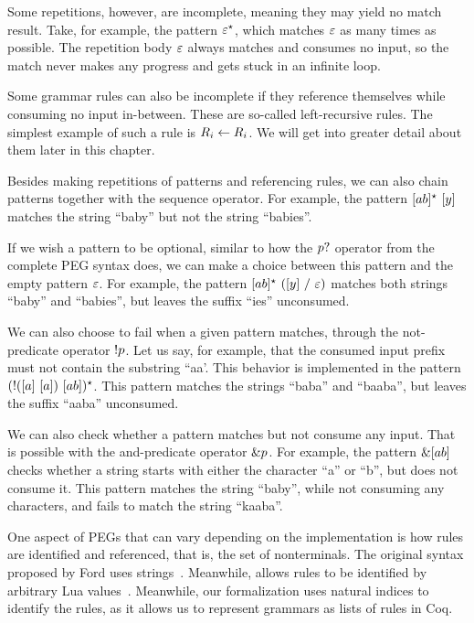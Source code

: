 Some repetitions, however, are incomplete,
meaning they may yield no match result.
Take, for example, the pattern $\varepsilon^\star$,
which matches $\varepsilon$ as many times as possible.
The repetition body $\varepsilon$ always matches and consumes no input,
so the match never makes any progress and gets stuck in an infinite loop.

Some grammar rules can also be incomplete
if they reference themselves
while consuming no input in-between.
These are so-called left-recursive rules.
The simplest example of such a rule is $R_{i} \leftarrow R_{i}$.
We will get into greater detail about them later in this chapter.

Besides making repetitions of patterns
and referencing rules,
we can also chain patterns together
with the sequence operator.
For example,
the pattern $[ab]^\star\ [y]$
matches the string ``baby'' but not the string ``babies''.

If we wish a pattern to be optional,
similar to how the $p?$ operator from the
complete PEG syntax does,
we can make a choice between this pattern
and the empty pattern $\varepsilon$.
For example,
the pattern $[ab]^\star\ ([y]\ /\ \varepsilon)$
matches both strings ``baby'' and ``babies'',
but leaves the suffix ``ies'' unconsumed.

We can also choose to fail when a given pattern matches,
through the not-predicate operator $!p$.
Let us say, for example,
that the consumed input prefix
must not contain the substring ``aa'.
This behavior is implemented in the pattern
$(!([a]\ [a])\ [ab])^\star$.
This pattern matches the strings ``baba'' and ``baaba'',
but leaves the suffix ``aaba'' unconsumed.

We can also check whether a pattern matches
but not consume any input.
That is possible with the and-predicate operator $\&p$.
For example,
the pattern $\&[ab]$
checks whether a string
starts with either the character ``a'' or ``b'',
but does not consume it.
This pattern matches the string ``baby'',
while not consuming any characters,
and fails to match the string ``kaaba''.

One aspect of PEGs that can vary
depending on the implementation
is how rules are identified and referenced,
that is, the set of nonterminals.
The original syntax proposed by Ford
uses strings~\cite{ford_parsing_2004}.
Meanwhile,
\lpeg{} allows rules to be identified
by arbitrary Lua values~\cite{ierusalimschy_lpeg_2024}.
Meanwhile, our formalization uses natural indices
to identify the rules,
as it allows us to represent
grammars as lists of rules in Coq.

